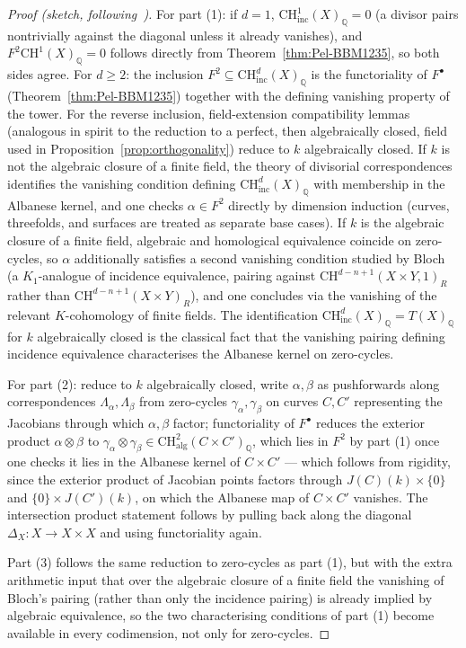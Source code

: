 \documentclass[12pt,a4paper]{article}
\theoremstyle{definition}
\newcommand{\CH}{\mathrm{CH}}
\newcommand{\Q}{\mathbb{Q}}
\newcommand{\alg}{\mathrm{alg}}
\newcommand{\inc}{\mathrm{inc}}
\begin{document}
\begin{proof}[Proof (sketch, following~\cite{PelRey25})]
For part (1): if $d=1$, $\CH^1_\inc(X)_\Q=0$ (a divisor pairs nontrivially
against the diagonal unless it already vanishes), and $F^2\CH^1(X)_\Q=0$
follows directly from Theorem~\ref{thm:Pel-BBM1235}, so both sides agree.
For $d\geq2$: the inclusion $F^2\subseteq\CH^d_\inc(X)_\Q$ is the
functoriality of $F^\bullet$ (Theorem~\ref{thm:Pel-BBM1235}) together with
the defining vanishing property of the tower.  For the reverse inclusion,
field-extension compatibility lemmas (analogous in spirit to the reduction
to a perfect, then algebraically closed, field used in
Proposition~\ref{prop:orthogonality}) reduce to $k$ algebraically closed.
If $k$ is not the algebraic closure of a finite field, the theory of
divisorial correspondences identifies the vanishing condition defining
$\CH^d_\inc(X)_\Q$ with membership in the Albanese kernel, and one checks
$\alpha\in F^2$ directly by dimension induction (curves, threefolds, and
surfaces are treated as separate base cases).  If $k$ is the algebraic
closure of a finite field, algebraic and homological equivalence coincide on
zero-cycles, so $\alpha$ additionally satisfies a second vanishing
condition studied by Bloch (a $K_1$-analogue of incidence equivalence,
pairing against $\CH^{d-n+1}(X\times Y,1)_R$ rather than
$\CH^{d-n+1}(X\times Y)_R$), and one concludes via the vanishing of the
relevant $K$-cohomology of finite fields.
The identification $\CH^d_\inc(X)_\Q=T(X)_\Q$ for $k$ algebraically closed
is the classical fact that the vanishing pairing defining incidence
equivalence characterises the Albanese kernel on zero-cycles.

For part (2): reduce to $k$ algebraically closed, write $\alpha,\beta$ as
pushforwards along correspondences $\Lambda_\alpha,\Lambda_\beta$ from
zero-cycles $\gamma_\alpha,\gamma_\beta$ on curves $C,C'$ representing the
Jacobians through which $\alpha,\beta$ factor; functoriality of $F^\bullet$
reduces the exterior product $\alpha\otimes\beta$ to
$\gamma_\alpha\otimes\gamma_\beta\in\CH^2_{\alg}(C\times C')_\Q$, which lies
in $F^2$ by part (1) once one checks it lies in the Albanese kernel of
$C\times C'$ — which follows from rigidity, since the exterior product of
Jacobian points factors through $J(C)(k)\times\{0\}$ and
$\{0\}\times J(C')(k)$, on which the Albanese map of $C\times C'$ vanishes.
The intersection product statement follows by pulling back along the
diagonal $\Delta_X:X\to X\times X$ and using functoriality again.

Part (3) follows the same reduction to zero-cycles as part (1), but with
the extra arithmetic input that over the algebraic closure of a finite
field the vanishing of Bloch's pairing (rather than only the incidence
pairing) is already implied by algebraic equivalence, so the two
characterising conditions of part (1) become available in every
codimension, not only for zero-cycles.
\end{proof}
\end{document}
